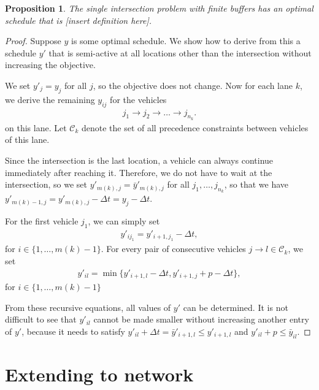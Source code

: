 \documentclass{article}
\theoremstyle{definition}
\theoremstyle{plain}
\newtheorem{proposition}{Proposition}[section]
\begin{document}
\begin{proposition}
  The single intersection problem with finite buffers has an optimal schedule
  that is [insert definition here].
\end{proposition}
\begin{proof}
  Suppose $y$ is some optimal schedule. We show how to derive from this a
  schedule $y'$ that is semi-active at all locations other than the intersection
  without increasing the objective.

  We set $y'_{j} = y_{j}$ for all $j$, so the objective does not change. Now for
  each lane $k$, we derive the remaining $y_{ij}$ for the vehicles
  \begin{align*}
    j_{1} \rightarrow j_{2} \rightarrow \dots \rightarrow j_{n_{k}} .
  \end{align*}
  on this lane. Let $\mathcal{C}_{k}$ denote the set of all precedence
  constraints between vehicles of this lane.

  Since the intersection is the last location, a vehicle can always continue
  immediately after reaching it. Therefore, we do not have to wait at the
  intersection, so we set $y'_{m(k),j} = \bar{y}'_{m(k),j}$ for all $j_{1},\dots, j_{n_{k}}$, so
  that we have $y'_{m(k)-1,j} = y'_{m(k),j} - \Delta t = y_{j} - \Delta t$.

  For the first vehicle $j_1$, we can simply set
  \begin{align*}
    y'_{ij_{1}} = y'_{i+1, j_{1}} - \Delta t ,
  \end{align*}
  for $i \in \{1, \dots, m(k) -1 \}$.
  For every pair of consecutive vehicles
  $j \rightarrow l \in \mathcal{C}_{k}$, we set
  \begin{align*}
    y'_{il} = \min \{ y'_{i+1, l} - \Delta t, y'_{i+1, j} + p - \Delta t  \},
  \end{align*}
  for $i \in \{1, \dots, m(k) -1 \}$

  From these recursive equations, all values of $y'$ can be determined. It is
  not difficult to see that $y'_{il}$ cannot be made smaller without increasing
  another entry of $y'$, because it needs to satisfy
  $y'_{il} + \Delta t = \bar{y}'_{i+1,l} \leq y'_{i+1,l}$ and
  $y'_{il} + p \leq \bar{y}_{il}$.
\end{proof}



\section{Extending to network}
\end{document}
